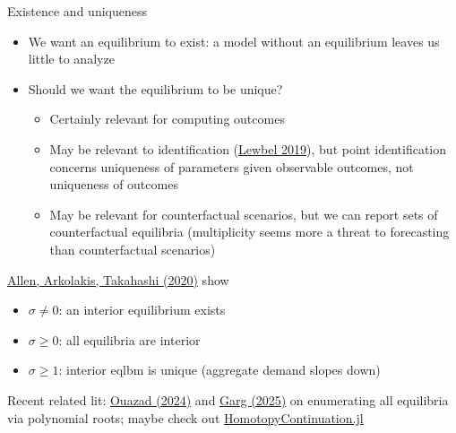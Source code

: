 \documentclass[10pt,notes=hide]{beamer}
\begin{document}
\begin{frame}{Existence and uniqueness}
\begin{itemize}
\item We want an equilibrium to exist:
a model without an equilibrium leaves us little to analyze
\item Should we want the equilibrium to be unique?
\begin{itemize}
\item Certainly relevant for computing outcomes
\item May be relevant to identification (\href{https://www.aeaweb.org/articles?id=10.1257/jel.20181361}{Lewbel 2019}),
but point identification concerns uniqueness of parameters given observable outcomes,
not uniqueness of outcomes
\item May be relevant for counterfactual scenarios,
but we can report sets of counterfactual equilibria
(multiplicity seems more a threat to forecasting than counterfactual scenarios)
\end{itemize}
\end{itemize}
\href{https://doi.org/10.1086/704385}{Allen, Arkolakis, Takahashi (2020)} show
\begin{itemize}
\item $\sigma \neq 0$: an interior equilibrium exists
\item $\sigma \geq 0$: all equilibria are interior
\item $\sigma \geq 1$: interior eqlbm is unique (aggregate demand slopes down)
\end{itemize}
\vspace{2mm}
{\small Recent related lit:
\href{https://dx.doi.org/10.2139/ssrn.4699361}{Ouazad (2024)} and
\href{https://economics.mit.edu/people/phd-students/tishara-garg}{Garg (2025)}
on enumerating all equilibria via polynomial roots;
maybe check out \href{https://www.juliahomotopycontinuation.org/}{HomotopyContinuation.jl}\par}
\end{frame}
\end{document}
